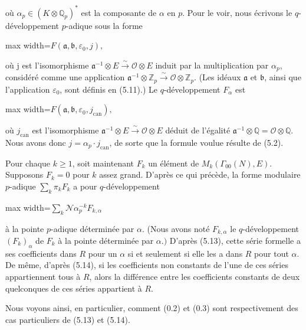 \documentclass[11pt]{article}
\newcommand{\DFormula}[1]{\par\smallskip\noindent\begin{adjustbox}{max width=\linewidth}$\displaystyle #1$\end{adjustbox}\par\smallskip}
\begin{document}
où \(\alpha _{p}\in (K\otimes \mathbb{Q}_{p})^{\ast}\) est la composante de \(\alpha \) en \(p\). Pour le voir, nous écrivons le \(q\)-développement \(p\)-adique sous la forme\par
\par
\DFormula{F(𝔞,𝔟,\varepsilon _{0},j),}
\par
où j est l’isomorphisme \(𝔞^{-1}\otimes E\xrightarrow{\sim}\mathcal{O}\otimes E\) induit par la multiplication par \(\alpha _{p}\), considéré comme une application \(𝔞^{-1}\otimes \mathbb{Z}_{p}\xrightarrow{\sim}\mathcal{O}\otimes \mathbb{Z}_{p}\). (Les idéaux \(𝔞\) et \(𝔟\), ainsi que l’application \(\varepsilon _{0}\), sont définis en (5.11).) Le \(q\)-développement \(F_{\alpha }\) est\par
\par
\DFormula{F(𝔞,𝔟,\varepsilon _{0},j_{\mathrm{can}}),}
\par
où \(j_{\mathrm{can}}\) est l’isomorphisme \(𝔞^{-1}\otimes E\xrightarrow{\sim}\mathcal{O}\otimes E\) déduit de l’égalité \(𝔞^{-1}\otimes \mathbb{Q}=\mathcal{O}\otimes \mathbb{Q}\). Nous avons donc \(j=\alpha _{p}\cdot j_{\mathrm{can}}\), de sorte que la formule voulue résulte de (5.2).\par
\par
Pour chaque \(k\geq 1\), soit maintenant \(F_{k}\) un élément de \(M_{k}(\Gamma _{00}(N),E)\). Supposons \(F_{k}=0\) pour \(k\) assez grand. D’après ce qui précède, la forme modulaire \(p\)-adique \(\sum _{k}\pi _{k}F_{k}\) a pour \(q\)-développement\par
\par
\DFormula{\sum _{k}\mathcal{N}\alpha _{p}^{-k}F_{k,\alpha }}
\par
à la pointe \(p\)-adique déterminée par \(\alpha \). (Nous avons noté \(F_{k,\alpha }\) le \(q\)-développement \((F_{k})_{\alpha }\) de \(F_{k}\) à la pointe déterminée par \(\alpha .)\) D’après (5.13), cette série formelle a ses coefficients dans \(R\) pour un \(\alpha \) si et seulement si elle les a dans \(R\) pour tout \(\alpha \). De même, d’après (5.14), si les coefficients non constants de l’une de ces séries appartiennent tous à \(R\), alors la différence entre les coefficients constants de deux quelconques de ces séries appartient à \(R\).\par
\par
Nous voyons ainsi, en particulier, comment (0.2) et (0.3) sont respectivement des cas particuliers de (5.13) et (5.14).\par
\par
\end{document}
